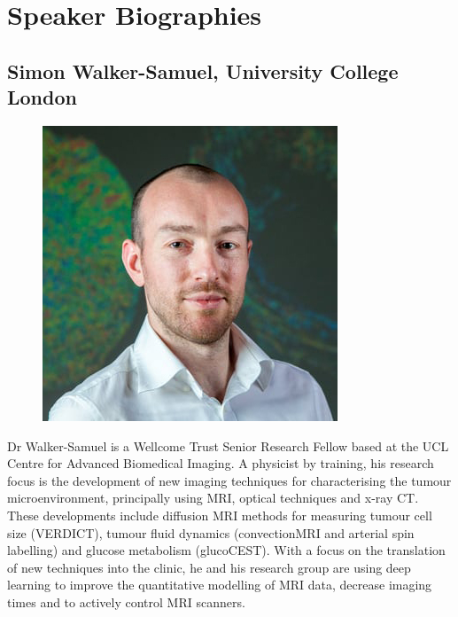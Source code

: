 \documentclass[a5paper,10pt,twoside,onecolumn,openany,helvetica,showtrims]{memoir}
\newlength{\SpeakerSize}
\begin{document}
\chapter{Speaker Biographies}
\vspace{-3em}
\section*{Simon Walker-Samuel, University College London}
\begin{figure}
\includegraphics[width=\SpeakerSize]{SpeakerPics/image1}	
\end{figure}
Dr Walker-Samuel is a Wellcome Trust Senior Research Fellow based at the UCL Centre for Advanced Biomedical Imaging. A physicist by training, his research focus is the development of new imaging techniques for characterising the tumour microenvironment, principally using MRI, optical techniques and x-ray CT. These developments include diffusion MRI methods for measuring tumour cell size (VERDICT), tumour fluid dynamics (convectionMRI and arterial spin labelling) and glucose metabolism (glucoCEST). With a focus on the translation of new techniques into the clinic, he and his research group are using deep learning to improve the quantitative modelling of MRI data, decrease imaging times and to actively control MRI scanners.
\end{document}
